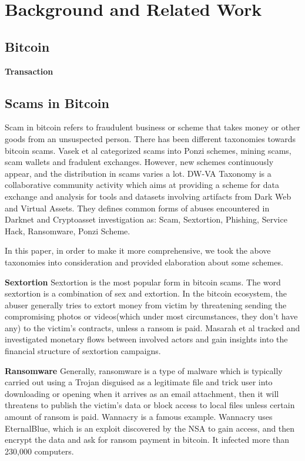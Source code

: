 \section{Background and Related Work}
\label{sec:background}
\subsection{Bitcoin}

\textbf{Transaction}

\subsection{Scams in Bitcoin}

Scam in bitcoin refers to fraudulent business or scheme that takes money or other goods from an unsuspected person. There has been different taxonomies towards bitcoin scams. Vasek et al \cite{vasek2015there} categorized scams into Ponzi schemes, mining scams, scam wallets and fradulent exchanges. However, new schemes continuously appear, and the distribution in scams varies a lot. DW-VA Taxonomy\cite{dwva} is a collaborative community activity which aims at providing a scheme for data exchange and analysis for tools and datasets involving artifacts from Dark Web and Virtual Assets. They defines common forms of abuses encountered in Darknet and Cryptoasset investigation as: Scam, Sextortion, Phishing, Service Hack, Ransomware, Ponzi Scheme.

In this paper, in order to make it more comprehensive, we took the above taxonomies into consideration and provided elaboration about some schemes.

\textbf{Sextortion}
Sextortion is the most popular form in bitcoin scams. The word sextortion is a combination of sex and extortion. In the bitcoin ecosystem, the abuser generally tries to extort money from victim by threatening sending the compromising photos or videos(which under most circumstances, they don't have any) to the victim's contracts, unless a ransom is paid. Masarah et al \cite{paquet2019spams} tracked and investigated monetary flows between involved actors and gain insights into the financial structure of sextortion campaigns.



\textbf{Ransomware}
Generally, ransomware is a type of malware which is typically carried out using a Trojan disguised as a legitimate file and trick user into downloading or opening when it arrives as an email attachment, then it will threatens to publish the victim's data or block access to local files unless certain amount of ransom is paid. Wannacry\cite{wannacry} is a famous example. Wannacry uses EternalBlue, which is an exploit discovered by the NSA to gain access, and then encrypt the data and ask for ransom payment in bitcoin. It infected more than 230,000 computers.

